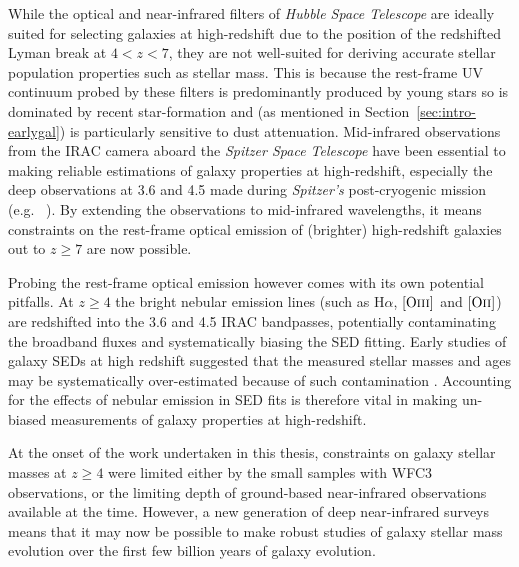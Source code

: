 While the optical and near-infrared filters of \emph{Hubble Space Telescope} are ideally suited for selecting galaxies at high-redshift due to the position of the redshifted Lyman break at $4 < z < 7$, they are not well-suited for deriving accurate stellar population properties such as stellar mass. This is because the rest-frame UV continuum probed by these filters is predominantly produced by young stars so is dominated by recent star-formation and (as mentioned in Section~\ref{sec:intro-earlygal}) is particularly sensitive to dust attenuation. Mid-infrared observations from the IRAC camera \citep{Fazio:2004eb} aboard the \emph{Spitzer Space Telescope} have been essential to making reliable estimations of galaxy properties at high-redshift, especially the deep observations at 3.6 and 4.5 \micron{} made during \emph{Spitzer's} post-cryogenic mission (e.g. \citeauthor{Ashby:2013cc}~\citeyear{Ashby:2013cc}). By extending the observations to mid-infrared wavelengths, it means constraints on the rest-frame optical emission of (brighter) high-redshift galaxies out to $z \geq 7$ are now possible.

Probing the rest-frame optical emission however comes with its own potential pitfalls. At $z \geq 4$ the bright nebular emission lines (such as H$\alpha$, $[\text{O}\textsc{iii}]$ and $[\text{O}\textsc{ii}]$) are redshifted into the 3.6 and 4.5 \micron{} IRAC bandpasses, potentially contaminating the broadband fluxes and systematically biasing the SED fitting. Early studies of galaxy SEDs at high redshift suggested that the measured stellar masses and ages may be systematically over-estimated because of such contamination \citep{2009A&A...502..423S,2010A&A...515A..73S,Ono:2010ed}. Accounting for the effects of nebular emission in SED fits is therefore vital in making un-biased measurements of galaxy properties at high-redshift.

At the onset of the work undertaken in this thesis, constraints on galaxy stellar masses at $z \geq 4$ were limited either by the small samples \citep{Gonzalez:2011dn} with WFC3 observations, or the limiting depth of ground-based near-infrared observations \citep{Stark:2007gi} available at the time. However, a new generation of deep near-infrared surveys means that it may now be possible to make robust studies of galaxy stellar mass evolution over the first few billion years of galaxy evolution.

